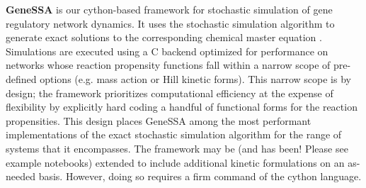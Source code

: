 \textbf{GeneSSA} is our cython-based framework for stochastic simulation of gene regulatory network dynamics. It uses the stochastic simulation algorithm to generate exact solutions to the corresponding chemical master equation \cite{Gillespie1977}. Simulations are executed using a C backend optimized for performance on networks whose reaction propensity functions fall within a narrow scope of pre-defined options (e.g. mass action or Hill kinetic forms). This narrow scope is by design; the framework prioritizes computational efficiency at the expense of flexibility by explicitly hard coding a handful of functional forms for the reaction propensities. This design places GeneSSA among the most performant implementations of the exact stochastic simulation algorithm for the range of systems that it encompasses. The framework may be (and has been! Please see example notebooks) extended to include additional kinetic formulations on an as-needed basis. However, doing so requires a firm command of the cython language.
